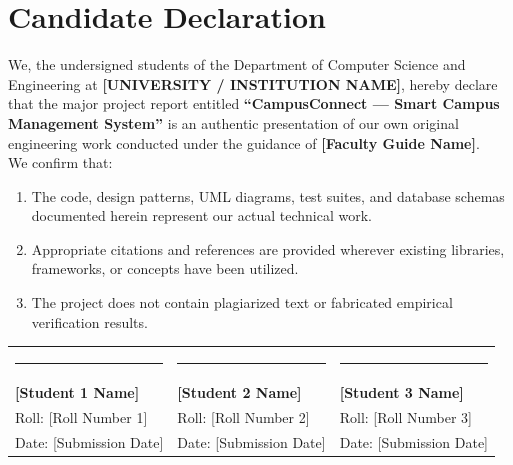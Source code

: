 \documentclass[12pt,a4paper,oneside]{report}
\begin{document}
\chapter*{Candidate Declaration}
We, the undersigned students of the Department of Computer Science and Engineering at \textbf{[UNIVERSITY / INSTITUTION NAME]}, hereby declare that the major project report entitled \textbf{``CampusConnect --- Smart Campus Management System''} is an authentic presentation of our own original engineering work conducted under the guidance of \textbf{[Faculty Guide Name]}.\\[0.5cm]
We confirm that:
\begin{enumerate}
    \item The code, design patterns, UML diagrams, test suites, and database schemas documented herein represent our actual technical work.
    \item Appropriate citations and references are provided wherever existing libraries, frameworks, or concepts have been utilized.
    \item The project does not contain plagiarized text or fabricated empirical verification results.
\end{enumerate}

\vspace{1.5cm}
\noindent
\begin{tabular}{lll}
    \rule{4.5cm}{0.4pt} & \rule{4.5cm}{0.4pt} & \rule{4.5cm}{0.4pt} \\
    \textbf{[Student 1 Name]} & \textbf{[Student 2 Name]} & \textbf{[Student 3 Name]} \\
    Roll: [Roll Number 1] & Roll: [Roll Number 2] & Roll: [Roll Number 3] \\
    Date: [Submission Date] & Date: [Submission Date] & Date: [Submission Date] \\
\end{tabular}

\newpage
\end{document}
